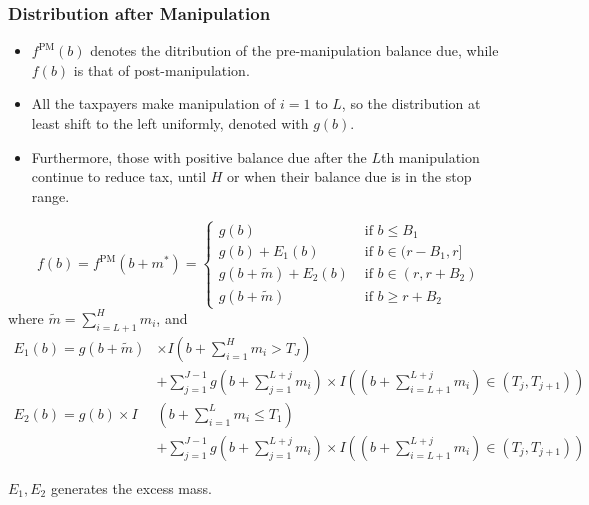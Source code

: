 \documentclass[dvipdfmx,12pt]{beamer}
\begin{document}
\begin{frame}\frametitle{Distribution after Manipulation}
  \begin{itemize}
    \item $f^{\text{PM}}(b)$ denotes the ditribution of the pre-manipulation
    balance due, while $f(b)$ is that of post-manipulation.

    \item All the taxpayers make manipulation of $i=1$ to $L$, so the
    distribution at least shift to the left uniformly, denoted with $g(b)$.

    \item Furthermore, those with positive balance due after the $L$th
    manipulation continue to reduce tax, until $H$ or when their balance due
    is in the stop range.
  \end{itemize}
\end{frame}
\begin{frame}
  \small
  \[
  f(b) = f^{\text{PM}}(b+m^*) = \begin{cases}
  g(b) &\text{ if } b \leq B_1 \\
  g(b) + E_1 (b) &\text{ if } b \in (r - B_1, r] \\
  g(b + \tilde{m}) + E_2(b) &\text{ if } b \in (r, r + B_2) \\
  g(b + \tilde{m}) &\text{ if } b \geq r + B_2
\end{cases}
  \]
  \normalsize
  where $\tilde{m} = \sum_{i = L+1}^{H}m_i$, and
  \scriptsize
  \begin{align*}
    E_1(b) = g(b + \tilde{m})& \times I
    \left( b + \sum_{i = 1}^{H}m_i > T_J \right )\\
    & + \sum_{j=1}^{J-1}g \left( b + \sum_{j=1}^{L+j}m_i \right)
    \times I \left( \left( b + \sum_{i = L+1}^{L+j}m_i \right)
    \in (T_j, T_{j+1}) \right) \\
    E_2(b) = g(b) \times I &
    \left( b + \sum_{i = 1}^{L}m_i \leq T_1 \right )\\
    & + \sum_{j=1}^{J-1}g \left( b + \sum_{j=1}^{L+j}m_i \right)
    \times I \left( \left( b + \sum_{i = L+1}^{L+j}m_i \right)
    \in (T_j, T_{j+1}) \right)
  \end{align*}
  \normalsize

  $E_1, E_2$ generates the excess mass.
\end{frame}
\end{document}
